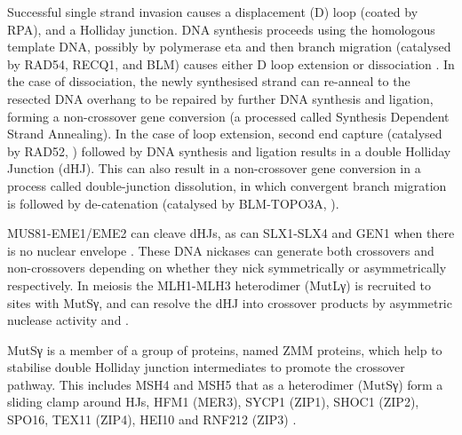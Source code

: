Successful single strand invasion causes a displacement (D) loop (coated by RPA), and a Holliday junction. DNA synthesis proceeds using the homologous template DNA, possibly by polymerase eta \parencite{McIlwraith2005Human, Kawamoto2005Dual} and then branch migration (catalysed by RAD54, RECQ1, and BLM) causes either D loop extension or dissociation \parencite{Bugreev2006Rad54,Bugreev2008RECQ1, Mazina2012Polarity}. In the case of dissociation, the newly synthesised strand can re-anneal to the resected DNA overhang to be repaired by further DNA synthesis and ligation, forming a non-crossover gene conversion (a processed called Synthesis Dependent Strand Annealing). In the case of loop extension, second end capture (catalysed by RAD52, \cite{Sugiyama1998DNA, Sugiyama2006Rad52mediated, McIlwraith2008DNA, Lao2008Rad52}) followed by DNA synthesis and ligation results in a double Holliday Junction (dHJ). This can also result in a non-crossover gene conversion in a process called double-junction dissolution, in which convergent branch migration is followed by de-catenation (catalysed by BLM-TOPO3A, \cite{Wu2003Bloom, Bizard2014Dissolution}).

MUS81-EME1/EME2 can cleave dHJs, as can SLX1-SLX4 and GEN1 when there is no nuclear envelope \parencite[reviewed in][]{Wyatt2014Holliday}. These DNA nickases can generate both crossovers and non-crossovers depending on whether they nick symmetrically or asymmetrically respectively. In meiosis the MLH1-MLH3 heterodimer (MutLγ) is recruited to sites with MutSγ, and can resolve the dHJ into crossover products by asymmetric nuclease activity \parencite{Zakharyevich2012Delineation} and \parencite[reviewed in][]{Hunter2015Meiotic, Gray2016Control, Manhart2016Roles, Toledo2019mutation}. 

MutSγ is a member of a group of proteins, named ZMM proteins, which help to stabilise double Holliday junction intermediates to promote the crossover pathway. This includes MSH4 and MSH5 that as a heterodimer (MutSγ) form a sliding clamp around HJs, HFM1 (MER3), SYCP1 (ZIP1), SHOC1 (ZIP2), SPO16, TEX11 (ZIP4), HEI10 and RNF212 (ZIP3) \parencite[reviewed in][]{Pyatnitskaya2019Crossing}.


